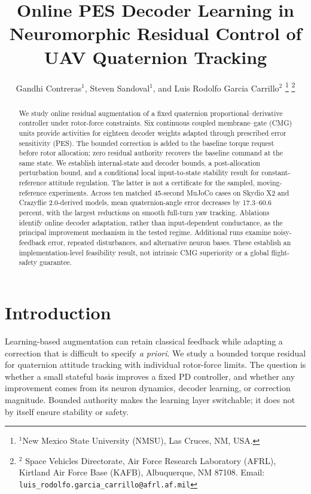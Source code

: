 \documentclass[letterpaper, 10 pt, conference]{ieeeconf}
\title{\LARGE \bf Online PES Decoder Learning in Neuromorphic Residual Control of UAV Quaternion Tracking}
\author{Gandhi Contreras$^{1}$, Steven Sandoval$^{1}$, and Luis Rodolfo Garcia Carrillo$^{2}$%
\thanks{$^{1}$New Mexico State University (NMSU), Las Cruces, NM, USA.}%
\thanks{$^{2}$ Space Vehicles Directorate, Air Force Research Laboratory (AFRL), Kirtland Air Force Base (KAFB), Albuquerque, NM 87108.
    Email: {\tt\small luis\_rodolfo.garcia\_carrillo@afrl.af.mil}}%
}
\begin{document}
\maketitle

\pagestyle{plain}
\thispagestyle{plain}

\begin{abstract}
We study online residual augmentation of a fixed quaternion proportional--derivative controller under rotor-force constraints. Six continuous coupled membrane--gate (CMG) units provide activities for eighteen decoder weights adapted through prescribed error sensitivity (PES). The bounded correction is added to the baseline torque request before rotor allocation; zero residual authority recovers the baseline command at the same state. We establish internal-state and decoder bounds, a post-allocation perturbation bound, and a conditional local input-to-state stability result for constant-reference attitude regulation. The latter is not a certificate for the sampled, moving-reference experiments. Across ten matched 45-second MuJoCo cases on Skydio X2 and Crazyflie 2.0-derived models, mean quaternion-angle error decreases by 17.3--60.6 percent, with the largest reductions on smooth full-turn yaw tracking. Ablations identify online decoder adaptation, rather than input-dependent conductance, as the principal improvement mechanism in the tested regime. Additional runs examine noisy-feedback error, repeated disturbances, and alternative neuron bases. These establish an implementation-level feasibility result, not intrinsic CMG superiority or a global flight-safety guarantee.
\end{abstract}

\section{Introduction}

Learning-based augmentation can retain classical feedback while adapting a correction that is difficult to specify \emph{a priori}. We study a bounded torque residual for quaternion attitude tracking with individual rotor-force limits. The question is whether a small stateful basis improves a fixed PD controller, and whether any improvement comes from its neuron dynamics, decoder learning, or correction magnitude. Bounded authority makes the learning layer switchable; it does not by itself ensure stability or safety.
\end{document}
